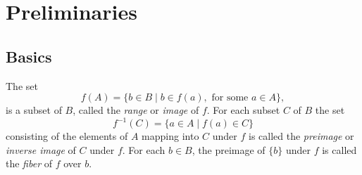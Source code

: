 \chapter*{Preliminaries}

\section{Basics}
The set 
\[
    f(A)=\{b\in B\mid b\in f(a),\text{ for some }a\in A\},
\]
is a subset of $B$, called the \textit{range} or \textit{image} of $f$.
For each subset $C$ of $B$ the set 
\[
    f^{-1}(C)=\{a\in A\mid f(a)\in C\}
\]
consisting of the elements of $A$ mapping into $C$ under $f$ is called the \textit{preimage} or \textit{inverse image} of $C$ under $f$.
For each $b\in B$, the preimage of $\{b\}$ under $f$ is called the \textit{fiber} of $f$ over $b$.

